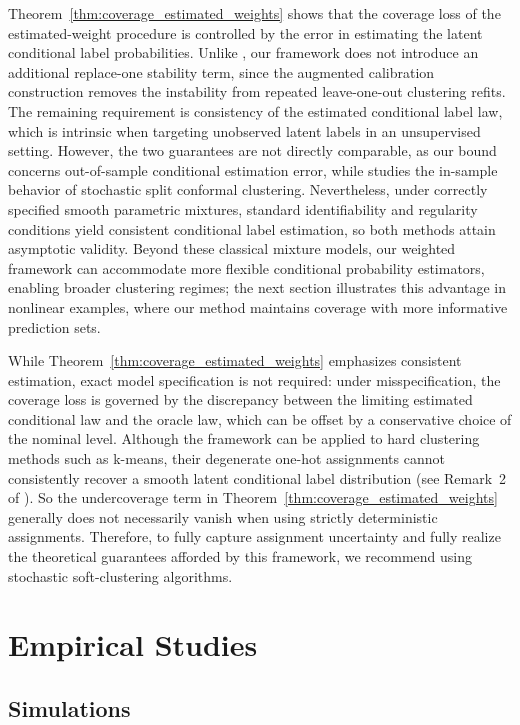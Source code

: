 \documentclass[11pt,letterpaper]{article}
\theoremstyle{definition}
\begin{document}
Theorem~\ref{thm:coverage_estimated_weights} shows that the coverage loss of the estimated-weight procedure is controlled by the error in estimating the latent conditional label probabilities. Unlike \cite{hur2026inference}, our framework does not introduce an additional replace-one stability term, since the augmented calibration construction removes the instability from repeated leave-one-out clustering refits. The remaining requirement is consistency of the estimated conditional label law, which is intrinsic when targeting unobserved latent labels in an unsupervised setting. However, the two guarantees are not directly comparable, as our bound concerns out-of-sample conditional estimation error, while \cite{hur2026inference} studies the in-sample behavior of stochastic split conformal clustering. Nevertheless, under correctly specified smooth parametric mixtures, standard identifiability and regularity conditions yield consistent conditional label estimation, so both methods attain asymptotic validity. Beyond these classical mixture models, our weighted framework can accommodate more flexible conditional probability estimators, enabling broader clustering regimes; the next section illustrates this advantage in nonlinear examples, where our method maintains coverage with more informative prediction sets.

While Theorem~\ref{thm:coverage_estimated_weights} emphasizes consistent estimation, exact model specification is not required: under misspecification, the coverage loss is governed by the discrepancy between the limiting estimated conditional law and the oracle law, which can be offset by a conservative choice of the nominal level. Although the framework can be applied to hard clustering methods such as k-means, their degenerate one-hot assignments cannot consistently recover a smooth latent conditional label distribution (see Remark~2 of \cite{hur2026inference}). So the undercoverage term in Theorem~\ref{thm:coverage_estimated_weights} generally does not necessarily vanish when using strictly deterministic assignments. Therefore, to fully capture assignment uncertainty and fully realize the theoretical guarantees afforded by this framework, we recommend using stochastic soft-clustering algorithms.

\section{Empirical Studies}

\subsection{Simulations}
\end{document}
